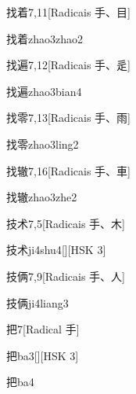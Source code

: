 \begin{entry}{找着}{7,11}[Radicais ⼿、⽬]
  \begin{phonetics}{找着}{zhao3zhao2}
  \end{phonetics}
\end{entry}

\begin{entry}{找遍}{7,12}[Radicais ⼿、⾡]
  \begin{phonetics}{找遍}{zhao3bian4}
  \end{phonetics}
\end{entry}

\begin{entry}{找零}{7,13}[Radicais ⼿、⾬]
  \begin{phonetics}{找零}{zhao3ling2}
  \end{phonetics}
\end{entry}

\begin{entry}{找辙}{7,16}[Radicais ⼿、⾞]
  \begin{phonetics}{找辙}{zhao3zhe2}
  \end{phonetics}
\end{entry}

\begin{entry}{技术}{7,5}[Radicais ⼿、⽊]
  \begin{phonetics}{技术}{ji4shu4}[][HSK 3]
  \end{phonetics}
\end{entry}

\begin{entry}{技俩}{7,9}[Radicais ⼿、⼈]
  \begin{phonetics}{技俩}{ji4liang3}
  \end{phonetics}
\end{entry}

\begin{entry}{把}{7}[Radical ⼿]
  \begin{phonetics}{把}{ba3}[][HSK 3]
  \end{phonetics}
  \begin{phonetics}{把}{ba4}
  \end{phonetics}
\end{entry}

